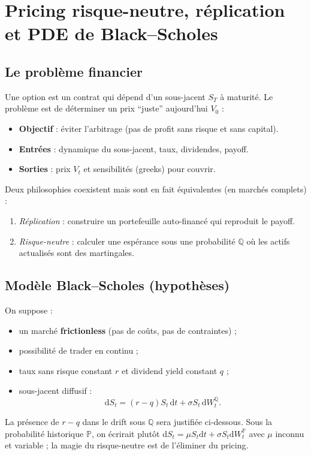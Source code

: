 \documentclass[11pt,a4paper]{report}
\newcommand{\dd}{\mathrm{d}}
\newcommand{\Prob}{\mathbb{P}}
\newcommand{\Q}{\mathbb{Q}}
\newcommand{\1}{\mathbbm{1}}
\theoremstyle{definition}
\theoremstyle{plain}
\theoremstyle{remark}
\begin{document}
\chapter{Pricing risque-neutre, réplication et PDE de Black--Scholes}
\label{chap:risk_neutral}

\section{Le problème financier}
Une option est un contrat qui dépend d'un sous-jacent $S_T$ à maturité.
Le problème est de déterminer un prix ``juste'' aujourd'hui $V_0$ :
\begin{itemize}
  \item \textbf{Objectif} : éviter l'arbitrage (pas de profit sans risque et sans capital).
  \item \textbf{Entrées} : dynamique du sous-jacent, taux, dividendes, payoff.
  \item \textbf{Sorties} : prix $V_t$ et sensibilités (greeks) pour couvrir.
\end{itemize}

Deux philosophies coexistent mais sont en fait équivalentes (en marchés complets) :
\begin{enumerate}[label=\alph*)]
  \item \emph{Réplication} : construire un portefeuille auto-financé qui reproduit le payoff.
  \item \emph{Risque-neutre} : calculer une espérance sous une probabilité $\Q$ où les actifs actualisés sont des martingales.
\end{enumerate}

\section{Modèle Black--Scholes (hypothèses)}
On suppose :
\begin{itemize}
  \item un marché \textbf{frictionless} (pas de coûts, pas de contraintes) ;
  \item possibilité de trader en continu ;
  \item taux sans risque constant $r$ et dividend yield constant $q$ ;
  \item sous-jacent diffusif :
  \[
  \dd S_t = (r-q)S_t\,\dd t + \sigma S_t\,\dd W_t^{\Q}.
  \]
\end{itemize}
La présence de $r-q$ dans le drift sous $\Q$ sera justifiée ci-dessous.
Sous la probabilité historique $\Prob$, on écrirait plutôt $\dd S_t=\mu S_t\dd t + \sigma S_t\dd W_t^{\Prob}$ avec $\mu$ inconnu et variable ; la magie du risque-neutre est de l'éliminer du pricing.
\end{document}
